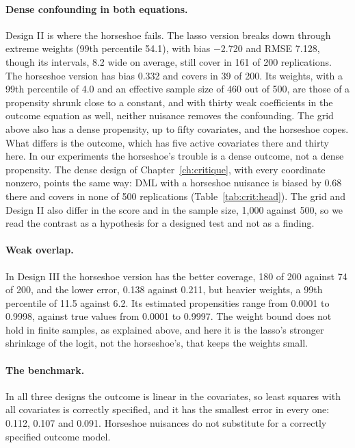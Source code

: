 \paragraph{Dense confounding in both equations.} Design II is where the horseshoe fails. The lasso version breaks down through extreme weights (99th percentile 54.1), with bias $-$2.720 and RMSE 7.128, though its intervals, 8.2 wide on average, still cover in 161 of 200 replications. The horseshoe version has bias 0.332 and covers in 39 of 200. Its weights, with a 99th percentile of 4.0 and an effective sample size of 460 out of 500, are those of a propensity shrunk close to a constant, and with thirty weak coefficients in the outcome equation as well, neither nuisance removes the confounding. The grid above also has a dense propensity, up to fifty covariates, and the horseshoe copes. What differs is the outcome, which has five active covariates there and thirty here. In our experiments the horseshoe's trouble is a dense outcome, not a dense propensity. The dense design of Chapter~\ref{ch:critique}, with every coordinate nonzero, points the same way: DML with a horseshoe nuisance is biased by 0.68 there and covers in none of 500 replications (Table~\ref{tab:crit:head}). The grid and Design II also differ in the score and in the sample size, 1,000 against 500, so we read the contrast as a hypothesis for a designed test and not as a finding.

\paragraph{Weak overlap.} In Design III the horseshoe version has the better coverage, 180 of 200 against 74 of 200, and the lower error, 0.138 against 0.211, but heavier weights, a 99th percentile of 11.5 against 6.2. Its estimated propensities range from 0.0001 to 0.9998, against true values from 0.0001 to 0.9997. The weight bound does not hold in finite samples, as explained above, and here it is the lasso's stronger shrinkage of the logit, not the horseshoe's, that keeps the weights small.

\paragraph{The benchmark.} In all three designs the outcome is linear in the covariates, so least squares with all covariates is correctly specified, and it has the smallest error in every one: 0.112, 0.107 and 0.091. Horseshoe nuisances do not substitute for a correctly specified outcome model.
